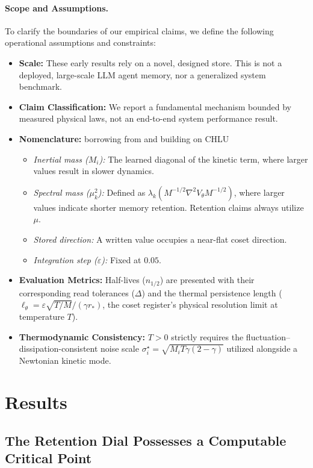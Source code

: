 \documentclass{article}
\begin{document}
\paragraph{Scope and Assumptions.}
To clarify the boundaries of our empirical claims, we define the following operational assumptions and constraints:
\begin{itemize}
    \item \textbf{Scale:} These early results rely on a novel, designed store. This is not a deployed, large-scale LLM agent memory, nor a generalized system benchmark.
    \item \textbf{Claim Classification:} We report a fundamental mechanism bounded by measured physical laws, not an end-to-end system performance result.
    \item \textbf{Nomenclature:} borrowing from and building on CHLU~\citep{jawahar_chlu_2026}
    \begin{itemize}
        \item \emph{Inertial mass ($M_i$):} The learned diagonal of the kinetic term, where larger values result in slower dynamics.
        \item \emph{Spectral mass ($\mu_k^2$):} Defined as $\lambda_k(M^{-1/2}\nabla^2V_\theta M^{-1/2})$, where larger values indicate shorter memory retention. Retention claims always utilize $\mu$.
        \item \emph{Stored direction:} A written value occupies a near-flat coset direction.
        \item \emph{Integration step ($\varepsilon$):} Fixed at $0.05$.
    \end{itemize}
    \item \textbf{Evaluation Metrics:} Half-lives ($n_{1/2}$) are presented with their corresponding read tolerances ($\Delta$) and the thermal persistence length ($\ell_\theta=\varepsilon\sqrt{T/M}/(\gamma r_*)$, the coset register's physical resolution limit at temperature $T$).
    \item \textbf{Thermodynamic Consistency:} $T>0$ strictly requires the fluctuation--dissipation-consistent noise scale $\sigma^\star_i=\sqrt{M_iT\gamma(2-\gamma)}$ utilized alongside a Newtonian kinetic mode.
\end{itemize}

\section{Results}\label{sec:results}

\subsection{The Retention Dial Possesses a Computable Critical Point}\label{sec:vcurve}
\end{document}
